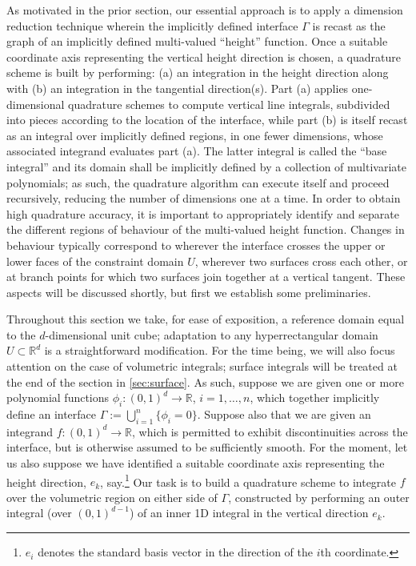 \documentclass[onefignum,onetabnum,onealgnum,oneeqnum]{siamart190516}
\newcommand{\R}{\mathbb R}
\begin{document}
As motivated in the prior section, our essential approach is to apply a dimension reduction technique wherein the implicitly defined interface $\Gamma$ is recast as the graph of an implicitly defined multi-valued ``height'' function. Once a suitable coordinate axis representing the vertical height direction is chosen, a quadrature scheme is built by performing: (a) an integration in the height direction along with (b) an integration in the tangential direction(s). Part (a) applies one-dimensional quadrature schemes to compute vertical line integrals, subdivided into pieces according to the location of the interface, while part (b) is itself recast as an integral over implicitly defined regions, in one fewer dimensions, whose associated integrand evaluates part (a). The latter integral is called the ``base integral'' and its domain shall be implicitly defined by a collection of multivariate polynomials; as such, the quadrature algorithm can execute itself and proceed recursively, reducing the number of dimensions one at a time. In order to obtain high quadrature accuracy, it is important to appropriately identify and separate the different regions of behaviour of the multi-valued height function. Changes in behaviour typically correspond to wherever the interface crosses the upper or lower faces of the constraint domain $U$, wherever two surfaces cross each other, or at branch points for which two surfaces join together at a vertical tangent. These aspects will be discussed shortly, but first we establish some preliminaries. %

Throughout this section we take, for ease of exposition, a reference domain equal to the $d$-dimensional unit cube; adaptation to any hyperrectangular domain $U \subset \R^d$ is a straightforward modification. For the time being, we will also focus attention on the case of volumetric integrals; surface integrals will be treated at the end of the section in \cref{sec:surface}. As such, suppose we are given one or more polynomial functions $\phi_i : (0,1)^d \to \R$, $i = 1, \ldots, n$, which together implicitly define an interface $\Gamma := \bigcup_{i=1}^n \{\phi_i = 0\}$. Suppose also that we are given an integrand $f : (0,1)^d \to \R$, which is permitted to exhibit discontinuities across the interface, but is otherwise assumed to be sufficiently smooth. For the moment, let us also suppose we have identified a suitable coordinate axis representing the height direction, $e_k$, say.\footnote{$e_i$ denotes the standard basis vector in the direction of the $i$th coordinate.} Our task is to build a quadrature scheme to integrate $f$ over the volumetric region on either side of $\Gamma$, constructed by performing an outer integral (over $(0,1)^{d-1}$) of an inner 1D integral in the vertical direction $e_k$.
\end{document}
